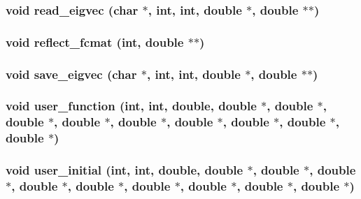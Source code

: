 \subsubsection{\setlength{\rightskip}{0pt plus 5cm}void read\_\-eigvec (char $\ast$, int, int, double $\ast$, double $\ast$$\ast$)}\label{md__proto_8h_0dd22f99640e2a6d39e01955918ac686}


\subsubsection{\setlength{\rightskip}{0pt plus 5cm}void reflect\_\-fcmat (int, double $\ast$$\ast$)}\label{md__proto_8h_082f5c3f9bd5908cc60126eb02d37ca6}


\subsubsection{\setlength{\rightskip}{0pt plus 5cm}void save\_\-eigvec (char $\ast$, int, int, double $\ast$, double $\ast$$\ast$)}\label{md__proto_8h_538cfdcdec971056b05563654dfd2081}


\subsubsection{\setlength{\rightskip}{0pt plus 5cm}void user\_\-function (int, int, double, double $\ast$, double $\ast$, double $\ast$, double $\ast$, double $\ast$, double $\ast$, double $\ast$, double $\ast$, double $\ast$)}\label{md__proto_8h_1b28c13e726cf8362937e3287d55f283}


\subsubsection{\setlength{\rightskip}{0pt plus 5cm}void user\_\-initial (int, int, double, double $\ast$, double $\ast$, double $\ast$, double $\ast$, double $\ast$, double $\ast$, double $\ast$, double $\ast$, double $\ast$)}\label{md__proto_8h_71a333184e63af803706726074f7586f}


